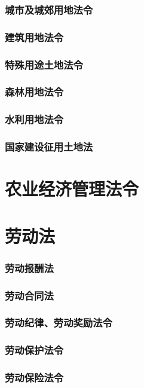 \documentclass[UTF8]{../ApplicationUniverse}
\begin{document}
        \subsubsection{城市及城郊用地法令}
        \subsubsection{建筑用地法令}
        \subsubsection{特殊用途土地法令}
        \subsubsection{森林用地法令}
        \subsubsection{水利用地法令}
        \subsubsection{国家建设征用土地法}

\section{农业经济管理法令}

\section{劳动法}
        \subsubsection{劳动报酬法}
        \subsubsection{劳动合同法}
        \subsubsection{劳动纪律、劳动奖励法令}
        \subsubsection{劳动保护法令}
        \subsubsection{劳动保险法令}
\end{document}
